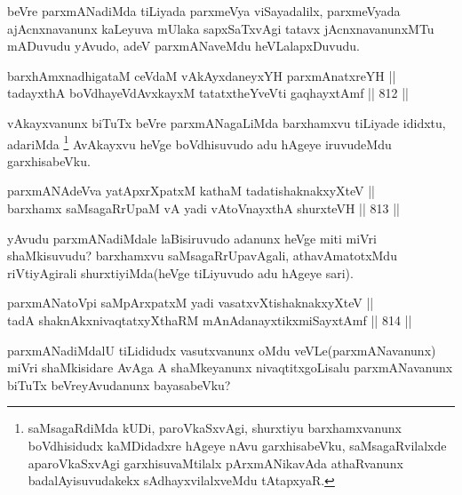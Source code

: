 \begin{artha}
beVre parxmANadiMda tiLiyada parxmeVya viSayadalilx, parxmeVyada ajAcnxnavanunx kaLeyuva mUlaka sapxSaTxvAgi tatavx jAcnxnavanunxMTu mADuvudu yAvudo, adeV parxmANaveMdu heVLalapxDuvudu.
\end{artha}


\begin{shl}
barxhAmxnadhigataM ceVdaM vAkAyxdaneyxYH parxmAnatxreYH || \\
tadayxthA boVdhayeVdAvxkayxM tatatxtheYveVti gaqhayxtAmf \hfill || 812 ||  
\end{shl}

\begin{artha}
vAkayxvanunx biTuTx beVre parxmANagaLiMda barxhamxvu tiLiyade ididxtu, adariMda \footnote{saMsagaRdiMda kUDi, paroVkaSxvAgi, shurxtiyu barxhamxvanunx boVdhisidudx kaMDidadxre hAgeye nAvu garxhisabeVku, saMsagaRvilalxde aparoVkaSxvAgi garxhisuvaMtilalx pArxmANikavAda athaRvanunx badalAyisuvudakekx sAdhayxvilalxveMdu tAtapxyaR.} AvAkayxvu heVge boVdhisuvudo adu hAgeye iruvudeMdu garxhisabeVku.
\end{artha}


\begin{shl}
parxmANAdeVva yatApxrXpatxM kathaM tadatishaknakxyXteV || \\
barxhamx saMsagaRrUpaM vA yadi vA\s toV\s nayxthA shurxteVH \hfill || 813 ||  
\end{shl}

\begin{artha}
yAvudu parxmANadiMdale laBisiruvudo adanunx heVge miti miVri shaMkisuvudu? barxhamxvu saMsagaRrUpavAgali, athavA\break matotxMdu riVtiyAgirali shurxtiyiMda(heVge tiLiyuvudo adu hAgeye sari).
\end{artha}

\begin{shl}
parxmANatoV\s pi saMpArxpatxM yadi vasatxvXtishaknakxyXteV || \\
tadA shaknAkxnivaqtatxyXthaRM mAnAdanayxtikxmiSayxtAmf \hfill || 814 ||  
\end{shl}

\begin{artha}
parxmANadiMdalU tiLididudx vasutxvanunx oMdu veVLe\break (parxmANavanunx) miVri shaMkisidare AvAga A shaMkeyanunx nivaqtitxgoLisalu parxmANavanunx biTuTx beVreyAvudanunx bayasabeVku?
\end{artha}

